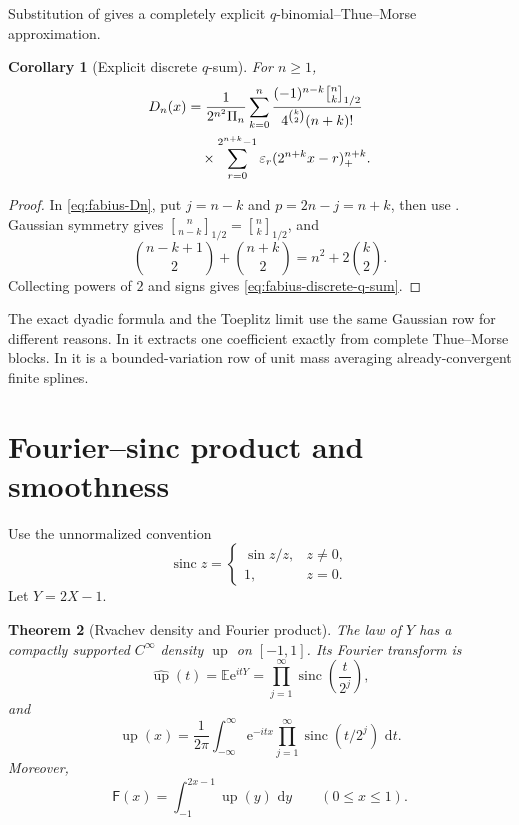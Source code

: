 \documentclass[11pt,oneside,openany]{book}
\newtheorem{theorem}{Theorem}[chapter]
\newtheorem{corollary}[theorem]{Corollary}
\theoremstyle{definition}
\theoremstyle{remark}
\newcommand{\Qbinom}[3]{\genfrac{[}{]}{0pt}{}{#1}{#2}_{#3}}
\newcommand{\eps}{\varepsilon}
\newcommand{\e}{\mathrm e}
\newcommand{\dd}{\,\mathrm d}
\newcommand{\Expect}{\mathbb E}
\newcommand{\Fab}{\mathsf F}
\newcommand{\Up}{\operatorname{up}}
\newcommand{\sinc}{\operatorname{sinc}}
\begin{document}
Substitution of  gives a completely explicit
$q$-binomial--Thue--Morse approximation.

\begin{corollary}[Explicit discrete $q$-sum]\label{cor:fabius-discrete-q-sum}
For $n\ge1$,
\begin{align}\label{eq:fabius-discrete-q-sum}
 D_n(x)
 &=\frac1{2^{n^2}\Pi_n}
 \sum_{k=0}^n
 \frac{(-1)^{n-k}\Qbinom nk{1/2}}
      {4^{\binom k2}(n+k)!}\notag\\
 &\quad\times
 \sum_{r=0}^{2^{n+k}-1}\eps_r(2^{n+k}x-r)_+^{n+k}.
\end{align}
\end{corollary}

\begin{proof}
In \eqref{eq:fabius-Dn}, put $j=n-k$ and
$p=2n-j=n+k$, then use
.  Gaussian symmetry gives
$\Qbinom n{n-k}{1/2}=\Qbinom nk{1/2}$, and
\[
 \binom{n-k+1}{2}+\binom{n+k}{2}
 =n^2+2\binom k2.
\]
Collecting powers of $2$ and signs gives
\eqref{eq:fabius-discrete-q-sum}.
\end{proof}

The exact dyadic formula and the Toeplitz limit use the same Gaussian row for
different reasons.  In  it extracts one
coefficient exactly from complete Thue--Morse blocks.  In
 it is a bounded-variation row of unit mass
averaging already-convergent finite splines.

\section{Fourier--sinc product and smoothness}\label{sec:fabius-fourier}

Use the unnormalized convention
\begin{equation}\label{eq:fabius-sinc}
 \sinc z=\begin{cases}\sin z/z,&z\ne0,\\1,&z=0.\end{cases}
\end{equation}
Let $Y=2X-1$.

\begin{theorem}[Rvachev density and Fourier product]\label{thm:fabius-Fourier}
The law of $Y$ has a compactly supported $C^\infty$ density $\Up$ on
$[-1,1]$.  Its Fourier transform is
\begin{equation}\label{eq:fabius-Fourier-product}
 \widehat{\Up}(t)=\Expect\e^{itY}
 =\prod_{j=1}^{\infty}\sinc\!\left(\frac t{2^j}\right),
\end{equation}
and
\begin{equation}\label{eq:fabius-Fourier-inversion}
 \Up(x)=\frac1{2\pi}\int_{-\infty}^{\infty}
 \e^{-itx}\prod_{j=1}^{\infty}\sinc(t/2^j)\,\dd t.
\end{equation}
Moreover,
\begin{equation}\label{eq:fabius-Up-F}
 \Fab(x)=\int_{-1}^{2x-1}\Up(y)\,\dd y
 \qquad(0\le x\le1).
\end{equation}
\end{theorem}
\end{document}
